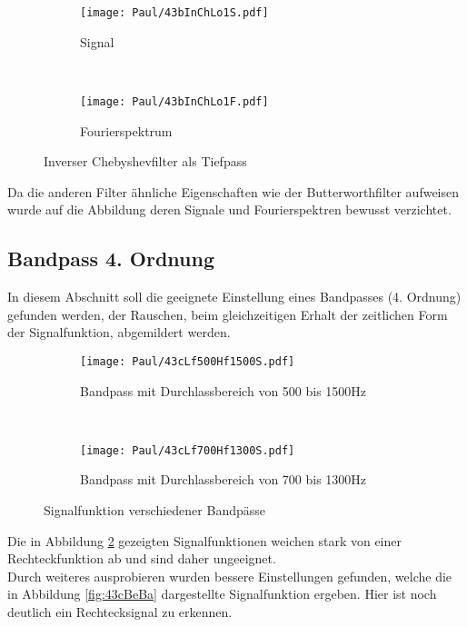\begin{figure}[h]
    \centering
    \begin{subfigure}{0.9\textwidth}
        \centering
        \texttt{[image: Paul/43bInChLo1S.pdf]}
        \caption{Signal}
    \end{subfigure}
    \\
    \begin{subfigure}{0.9\textwidth}
        \centering
        \texttt{[image: Paul/43bInChLo1F.pdf]}
        \caption{Fourierspektrum}
    \end{subfigure}
    \caption{Inverser Chebyshevfilter als Tiefpass}
    \label{fig:43bInChLo1}
\end{figure}

Da die anderen Filter ähnliche Eigenschaften wie der Butterworthfilter aufweisen wurde auf die Abbildung deren Signale und Fourierspektren bewusst verzichtet.\\

\newpage
\subsection{Bandpass 4. Ordnung}

In diesem Abschnitt soll die geeignete Einstellung eines Bandpasses (4. Ordnung) gefunden werden, der Rauschen, beim gleichzeitigen Erhalt der zeitlichen Form der Signalfunktion, abgemildert werden.
\begin{figure}[h]
    \centering
    \begin{subfigure}{0.9\textwidth}
        \centering
        \texttt{[image: Paul/43cLf500Hf1500S.pdf]}
        \caption{Bandpass mit Durchlassbereich von 500 bis 1500Hz}
    \end{subfigure}
    \\
    \begin{subfigure}{0.9\textwidth}
        \centering
        \texttt{[image: Paul/43cLf700Hf1300S.pdf]}
        \caption{Bandpass mit Durchlassbereich von 700 bis 1300Hz}
    \end{subfigure}
    \caption{Signalfunktion verschiedener Bandpässe}
    \label{fig:43cverBa}
\end{figure}

Die in Abbildung \ref{fig:43cverBa} gezeigten Signalfunktionen weichen stark von einer Rechteckfunktion ab und sind daher ungeeignet.\\
Durch weiteres ausprobieren wurden bessere Einstellungen gefunden, welche die in Abbildung \ref{fig:43cBeBa} dargestellte Signalfunktion ergeben. Hier ist noch deutlich ein Rechtecksignal zu erkennen.\\

